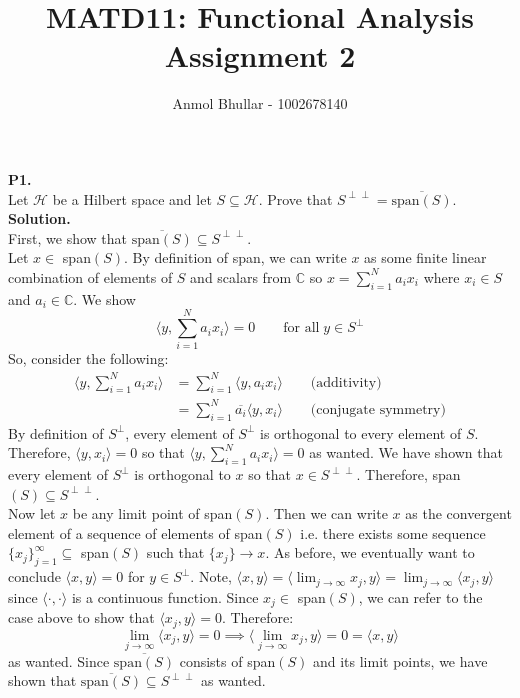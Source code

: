\documentclass{article}
\title{MATD11: Functional Analysis \\
    Assignment 2}
\author{Anmol Bhullar - 1002678140}
\begin{document}
    \maketitle

    \textbf{P1.}\\

    Let $\mathcal{H}$ be a Hilbert space and let $S\subseteq\mathcal{H}$. Prove that $S^{\perp\perp} = \overline{\text{span}(S)}$.\\

    \textbf{Solution.}\\

    First, we show that $\overline{\text{span}(S)}\subseteq S^{\perp\perp}$.\\
    Let $x\in$ span$(S)$. By definition of span, we can write $x$ as some finite linear combination of elements of $S$ and scalars
    from $\mathbb{C}$ so $x = \sum_{i=1}^N a_ix_i$ where $x_i\in S$ and $a_i\in\mathbb{C}$. We show
    \[ \langle y, \sum_{i=1}^N a_ix_i\rangle = 0\qquad \text{for all}\; y\in S^{\perp} \]
    So, consider the following:
    \begin{align*}
        \langle y,\sum_{i=1}^N a_ix_i\rangle &= \sum_{i=1}^N \langle y, a_ix_i\rangle\qquad\text{(additivity)} \\
            &= \sum_{i=1}^N \overline{a_i}\langle y,x_i\rangle\qquad\text{(conjugate symmetry)}
    \end{align*}
    By definition of $S^{\perp}$, every element of $S^{\perp}$ is orthogonal to every element of $S$. Therefore, 
    $\langle y,x_i\rangle=0$ so that $\langle y,\sum_{i=1}^N a_ix_i\rangle = 0$ as wanted. We have shown that every element of 
    $S^{\perp}$ is orthogonal to $x$ so that $x\in S^{\perp\perp}$. Therefore, span$(S)\subseteq S^{\perp\perp}$.\\
    Now let $x$ be any limit point of span$(S)$. Then we can write $x$ as the convergent element of a sequence of elements of span$(S)$
    i.e. there exists some sequence $\{x_j\}_{j=1}^{\infty}\subseteq$ span$(S)$ such that $\{x_j\}\to x$. As before, we eventually want
    to conclude $\langle x,y\rangle=0$ for $y\in S^{\perp}$. Note, $\langle x,y\rangle = \langle \lim_{j\to\infty} x_j,y\rangle =
    \lim_{j\to\infty} \langle x_j,y\rangle$ since $\langle\cdot,\cdot\rangle$ is a continuous function. Since $x_j\in$ span$(S)$, we
    can refer to the case above to show that $\langle x_j,y\rangle = 0$. Therefore:
    \[ \lim_{j\to\infty} \langle x_j,y\rangle = 0 \implies \langle \lim_{j\to\infty} x_j,y\rangle = 0 = \langle x,y\rangle \]
    as wanted. Since $\overline{\text{span}(S)}$ consists of span$(S)$ and its limit points, we have shown that
    $\overline{\text{span}(S)}\subseteq S^{\perp\perp}$ as wanted.\\
\end{document}
